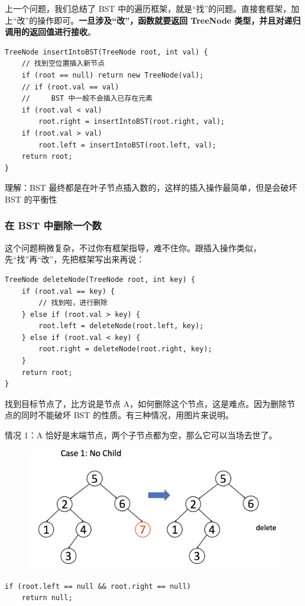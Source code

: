 \documentclass[12pt]{article}
\begin{document}
上一个问题，我们总结了 BST 中的遍历框架，就是“找”的问题。直接套框架，加上“改”的操作即可。\textbf{一旦涉及“改”，函数就要返回 TreeNode 类型，并且对递归调用的返回值进行接收}。
\begin{lstlisting}
TreeNode insertIntoBST(TreeNode root, int val) {
    // 找到空位置插入新节点
    if (root == null) return new TreeNode(val);
    // if (root.val == val)
    //     BST 中一般不会插入已存在元素
    if (root.val < val) 
        root.right = insertIntoBST(root.right, val);
    if (root.val > val) 
        root.left = insertIntoBST(root.left, val);
    return root;
}
\end{lstlisting}
\begin{framed}
理解：BST 最终都是在叶子节点插入数的，这样的插入操作最简单，但是会破坏 BST 的平衡性
\end{framed}

\subsubsection{在 BST 中删除一个数}
这个问题稍微复杂，不过你有框架指导，难不住你。跟插入操作类似，先“找”再“改”，先把框架写出来再说：
\begin{lstlisting}
TreeNode deleteNode(TreeNode root, int key) {
    if (root.val == key) {
        // 找到啦，进行删除
    } else if (root.val > key) {
        root.left = deleteNode(root.left, key);
    } else if (root.val < key) {
        root.right = deleteNode(root.right, key);
    }
    return root;
}
\end{lstlisting}

找到目标节点了，比方说是节点 A，如何删除这个节点，这是难点。因为删除节点的同时不能破坏 BST 的性质。有三种情况，用图片来说明。

情况 1：A 恰好是末端节点，两个子节点都为空，那么它可以当场去世了。
\begin{figure}[H]
    \centering
    \includegraphics[width=.6\textwidth]{fig/BST_Delete_1.png}
\end{figure}
\begin{lstlisting}
if (root.left == null && root.right == null)
    return null;
\end{lstlisting}
\end{document}
